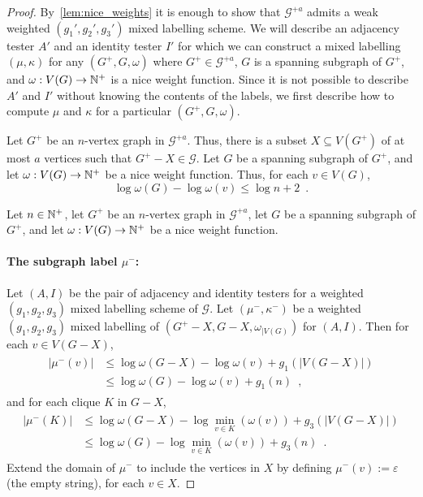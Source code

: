 \documentclass{patmorin}
\renewcommand{\le}{\leqslant}
\newcommand{\calG}{\mathcal{G}}
\begin{document}
\begin{proof}
  By~\cref{lem:nice_weights} it is enough to show that $\calG^{+a}$ admits a weak weighted $(g_1',g_2',g_3')$ mixed labelling scheme. We will describe an adjacency tester $A'$ and an identity tester $I'$ for which we can construct a mixed labelling $(\mu,\kappa)$ for any $(G^+,G,\omega)$ where $G^+\in \calG^{+a}$, $G$ is a spanning subgraph of $G^+$, and $\omega:V(G)\to\mathbb{N}^+$ is a nice weight function.
  Since it is not possible to describe $A'$ and $I'$ without knowing the contents of the labels, we first describe how to compute $\mu$ and $\kappa$ for a particular $(G^+,G,\omega)$.

  Let $G^+$ be an $n$-vertex graph in $\calG^{+a}$.  Thus, there is a subset $X\subseteq V(G^+)$ of at most $a$ vertices such that $G^+-X\in\calG$.  Let $G$ be a spanning subgraph of $G^+$, and let $\omega:V(G)\to\mathbb{N}^+$ be a nice weight function.
  Thus, for each $v\in V(G)$,
  \begin{equation}
    \log\omega(G)-\log\omega(v)\le\log n + 2\enspace.
  \end{equation}

  Let $n\in \mathbb{N}^+$,
  let $G^+$ be an $n$-vertex graph in $\calG^{+a}$,    let $G$ be a spanning subgraph of $G^+$,    and
  let $\omega:V(G)\to\mathbb{N}^+$ be a nice weight function.

  \paragraph{\boldmath The subgraph label $\mu^-$:}
  Let $(A,I)$ be the pair of adjacency and identity testers for a weighted $(g_1,g_2,g_3)$ mixed labelling scheme of $\calG$.
  Let $(\mu^-,\kappa^-)$ be a weighted $(g_1,g_2,g_3)$ mixed labelling of $(G^+-X, G-X,\omega_{|V(G)})$ for $(A,I)$.
  Then for each $v\in V(G-X)$,
  \begin{align}
    \begin{split}
      |\mu^-(v)|
       & \le \log\omega(G-X) -\log\omega(v)+g_1(|V(G-X)|) \\
       & \le \log\omega(G)-\log\omega(v)+g_1(n) \enspace,
    \end{split}
    \label{eq:mu-}
  \end{align}
  and for each clique $K$ in $G-X$,
  \begin{align}
    \label{eq:split}
    \begin{split}
      |\mu^-(K)|
       & \le \log\omega(G-X)-\log\min_{v\in K}(\omega(v))+g_3(|V(G-X)|)  \\
       & \le \log\omega(G)-\log\min_{v\in K}(\omega(v))+g_3(n) \enspace.
    \end{split}
  \end{align}
  Extend the domain of $\mu^-$ to include the vertices in $X$ by defining $\mu^-(v):=\varepsilon$ (the empty string), for each $v\in X$.


\end{proof}
\end{document}
